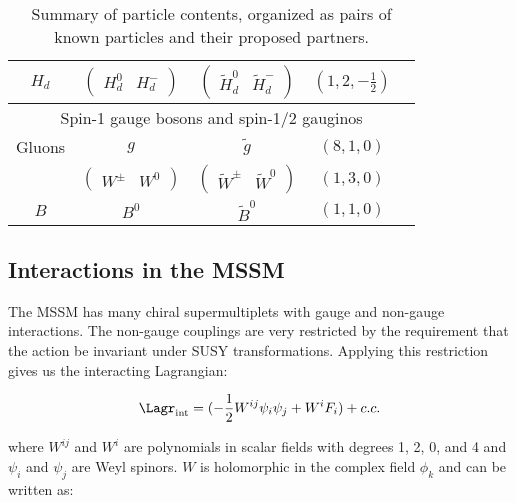 \begin{table}[!htb]
\begin{tabular}{c|c|c|c|c}
		$H_d$						& $\begin{pmatrix} H_d^0&H_d^-\end{pmatrix}$	& $\begin{pmatrix} \widetilde{H}_d^0&\widetilde{H}_d^-\end{pmatrix}$& $(1, 2, -\frac{1}{2})$		\\%
		\hline\hline
		\multicolumn{5}{c}{Spin-1 gauge bosons and spin-1/2 gauginos} \\
		\hline
		Gluons						& $g$											& $\tilde{g}$															& $(8, 1, 0)$					\\%
		\Wboson						& $\begin{pmatrix} W^{\pm}&W^0\end{pmatrix}$	& $\begin{pmatrix} \widetilde{W}^{\pm}&\widetilde{W}^0\end{pmatrix}$				& $(1, 3, 0)$					\\%
		$B$							& $B^0$											& $\widetilde{B}^0$															& $(1, 1, 0)$					\\%
		\hline\hline
	\end{tabular}
	\caption[Summary of \acrshort{mssm} particle contents]{Summary of {\mssm} particle contents, organized as pairs of known {\sm} particles and their proposed {\susy} partners.}
	\label{tab:smsusypartners}
\end{table}


\subsection{Interactions in the MSSM}

The MSSM has many chiral supermultiplets with gauge and non-gauge interactions.  The non-gauge couplings are very restricted by the requirement that the action be invariant under SUSY transformations.  Applying this restriction gives us the interacting Lagrangian:

\begin{equation}
	\Lagr_{\mathrm{int}} = ( -\frac{1}{2} W^{ij}\psi_{i}\psi_{j} + W^{i}F_{i}) + c.c.%
\end{equation}

where $W^{ij}$ and  $W^{i}$ are polynomials in scalar fields with degrees 1, 2, 0, and 4 and $\psi_{i}$ and $\psi_{j}$ are Weyl spinors.  $W$ is holomorphic in the complex field $\phi_{k}$ and can be written as:

